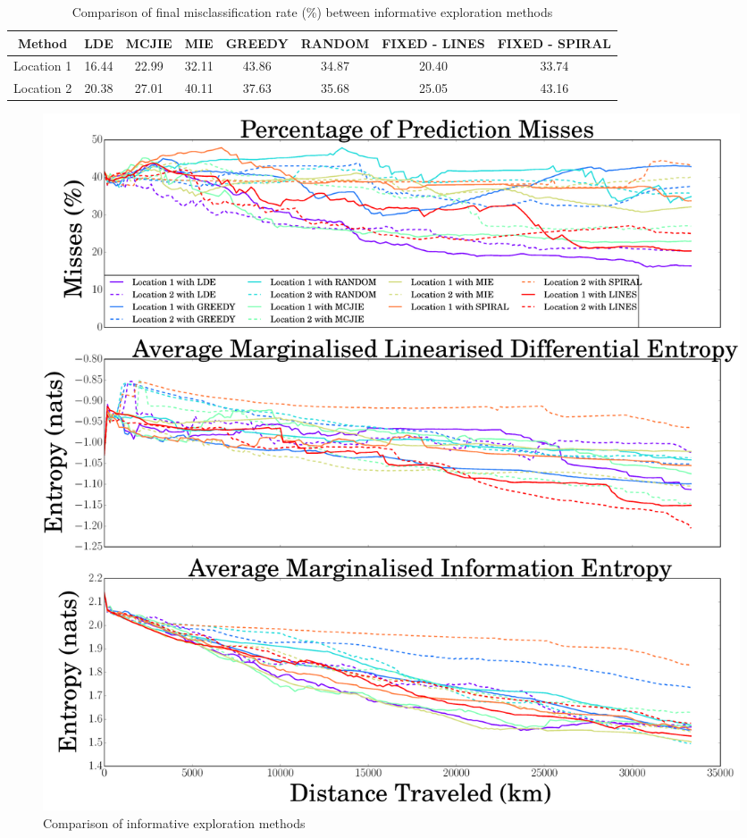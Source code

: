 \documentclass{article}
\begin{document}
		\begin{table}[t]
			\begin{center}
				\begin{tabular}{ |c||c|c|c|c|c|c|c| }
				\hline
				Method & LDE & MCJIE & MIE & GREEDY & RANDOM & FIXED - LINES & FIXED - SPIRAL \\
				\hline
				Location 1 & 16.44 & 22.99 & 32.11 & 43.86 & 34.87 & 20.40 & 33.74 \\
				Location 2 & 20.38 & 27.01 & 40.11 & 37.63 & 35.68 & 25.05 & 43.16 \\
				\hline
				\end{tabular}
			\end{center}
	  	\caption{Comparison of final misclassification rate (\%) between informative exploration methods}
	  	\label{Table:Results:CompareMethods}			
	  	\end{table}	
	  	
		\begin{figure}[!htbp]
		\centering
			\includegraphics[width = \linewidth]{Figures/compare_methods-eps-converted-to.png}
		\caption{Comparison of informative exploration methods}
		\label{Figure:Results:CompareMethods}
		\end{figure}
		
%	
%		
\end{document}
